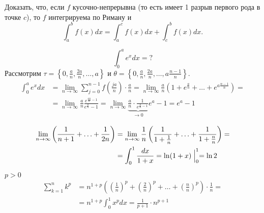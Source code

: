 \begin{prac}
    Доказать, что, если $ f $ кусочно-непрерывна (то есть имеет 1 разрыв первого рода в точке  $ c$), то  $ f$ интегрируема по Риману и 
    \[
	\int_{a}^{b} f(x) dx = \int_{a}^{c} f(x)dx + \int_{c}^{b} f(x)dx   
    .\] 
\end{prac}
\begin{ex}
    \[
\int_{0}^{a} e^{x}dx = ? 
    \] 
    Рассмотрим $ \tau  = \left\{0, \frac{a}{n}, \frac{2a}{n},\ldots, a \right\}$ и $ \theta  = \left\{0, \frac{a}{n}, \frac{2a}{n}, \ldots , a\frac{n-1}{n}\right\}$.
\[
\begin{aligned}
    \int_{0}^{a} e^{x}dx & = \lim_{n \to \infty} \sum_{j=0 }^{n-1} f\left( \frac{ja}{n} \right) \cdot \frac{a}{n}  = \lim_{n \to \infty} \frac{a}{n}\left( 1 + e^{\frac{a}{n}} + \ldots + e^{a\frac{n-1}{n}} \right) = \\ 
			 &= \lim_{n \to \infty} \frac{a}{n} \frac{e^{\frac{an}{n} - 1}}{e^{\frac{a}{n}}-1} = \lim_{n \to \infty} \underbrace{\frac{a}{n} \cdot \frac{1}{e^{\frac{a}{n}-1}}}_{ \to 0} e^{a } - 1 = e^{a }-1
\end{aligned}
\]
\end{ex}
\begin{ex}
    \[
    \begin{aligned}
	\lim_{n \to \infty} \left( \frac{1}{n+1} + \ldots + \frac{1}{2n} \right) & = \lim_{n \to \infty} \frac{1}{n} \left( \frac{1}{1+\frac{1}{n}} + \ldots  + \frac{1}{1+ \frac{n}{n}} \right)  = \\
										 &= \int_{0}^{1} \frac{dx}{1+x} = \ln(1+x) \Bigm|_0^{1} = \ln 2 
    \end{aligned}
    \]
\end{ex}
\begin{ex}
    $ p > 0$
    \[
    \begin{aligned}
	\sum_{k=1}^{n} k^{p} &= n^{1+p}\left( \left(\frac{1}{n}\right)^{p} + \left( \frac{2}{n} \right) ^{p} + \ldots + \left( \frac{n}{n} \right) ^{p} \right) \cdot \frac{1}{n} = \\
			     & = n^{1+p}\int_{0}^{1} x^{p} dx = \frac{1}{p+1} \cdot n^{p+1} 
    \end{aligned}
    \]
\end{ex}
